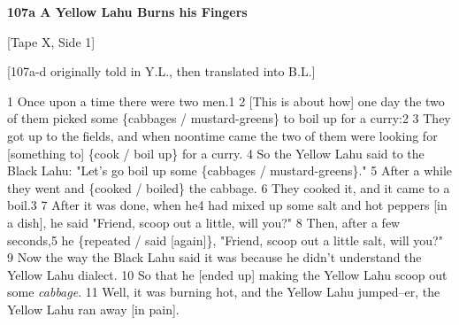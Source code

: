 
\textbf{107a A Yellow Lahu Burns his Fingers}

[Tape X, Side 1]

[107a-d originally told in Y.L., then translated into B.L.]

1 Once upon a time there were two men.1 2 [This is about how] one day the two of
them picked some \{cabbages / mustard-greens\} to boil up for a curry:2 3 They
got up to the fields, and when noontime came the two of them were looking for [something
to] \{cook / boil up\} for a curry. 4 So the Yellow Lahu said to the Black Lahu:
"Let's go boil up some \{cabbages / mustard-greens\}." 5 After
a while they went and \{cooked / boiled\} the cabbage. 6 They cooked it, and it
came to a boil.3 7 After it was done, when he4 had mixed up some salt and hot peppers
[in a dish], he said "Friend, scoop out a little, will you?"
8 Then, after a few seconds,5 he \{repeated / said [again]\}, "Friend,
scoop out a little salt, will you?" 9 Now the way the Black Lahu said
it was because he didn't understand the Yellow Lahu dialect. 10 So that he [ended
up] making the Yellow Lahu scoop out some \textit{cabbage}. 11 Well, it was burning
hot, and the Yellow Lahu jumped--er, the Yellow Lahu ran away [in pain].

